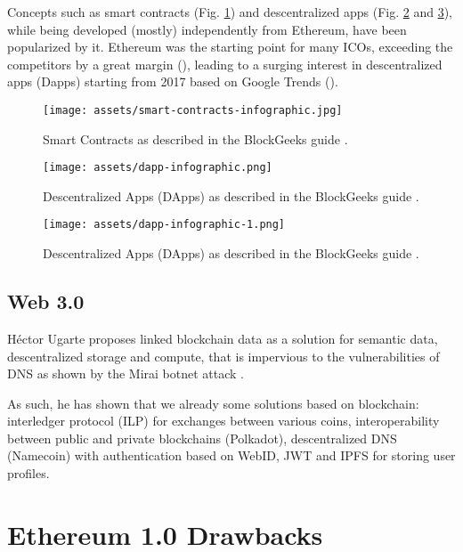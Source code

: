 \documentclass[runningheads]{llncs}
\begin{document}
Concepts such as smart contracts (Fig. \ref{fig:Features-1}) and descentralized apps (Fig. \ref{fig:Features-2} and \ref{fig:Features-3}), while being developed (mostly) independently from Ethereum,  have been popularized by it. Ethereum was the starting point for many ICOs, exceeding the competitors by a great margin (\cite{ICOstats}), leading to a surging interest in descentralized apps (Dapps) starting from 2017 based on Google Trends (\cite{GTrends}).

\begin{figure}
    \centering
    \texttt{[image: assets/smart-contracts-infographic.jpg]}
    \caption[Smart Contracts]{Smart Contracts as described in the BlockGeeks guide \cite{BGethGuide}.}
    \label{fig:Features-1}
\end{figure}

\begin{figure}
    \centering
    \texttt{[image: assets/dapp-infographic.png]}
    \caption[Descentralized Apps]{Descentralized Apps (DApps) as described in the BlockGeeks guide \cite{BGethGuide}.}
    \label{fig:Features-2}
\end{figure}

\begin{figure}
    \centering
    \texttt{[image: assets/dapp-infographic-1.png]}
    \caption[Descentralized Apps]{Descentralized Apps (DApps) as described in the BlockGeeks guide \cite{BGethGuide}.}
    \label{fig:Features-3}
\end{figure}


\subsection{Web 3.0}

Héctor Ugarte proposes linked blockchain data as a solution for semantic data, descentralized storage and compute, that is impervious to the vulnerabilities of DNS as shown by the Mirai botnet attack \cite{Ugarte17web3}.

As such, he has shown that we already some solutions based on blockchain: interledger protocol (ILP) for exchanges between various coins, interoperability between public and private blockchains (Polkadot), descentralized DNS (Namecoin) with authentication based on WebID, JWT and IPFS for storing user profiles.


\FloatBarrier
\section{Ethereum 1.0 Drawbacks}
\end{document}
